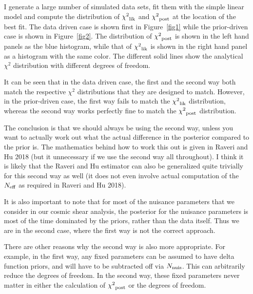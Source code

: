\documentclass[11pt]{article}
\newcommand{\nnuis}{{N_{\rm nuis}}}
\newcommand{\neff}{{N_{\rm eff}}}
\newcommand{\chisq}{{\chi^{2}}}
\begin{document}
I generate a large number of simulated data sets, fit them with the simple
linear model and compute the distribution of $\chisq_{\rm lik}$ and
$\chisq_{\rm post}$ at the location of the best fit. The data driven case is
shown first in Figure~\ref{fig1} while the prior-driven case is shown in
Figure~\ref{fig2}. The distribution of $\chisq_{\rm post}$ is shown in the left
hand panels as the blue histogram, while that of $\chisq_{\rm lik}$ is shown in
the right hand panel as a histogram with the same color. The different solid
lines show the analytical $\chisq$ distribution with different degrees of
freedom.

It can be seen that in the data driven case, the first and the second way both
match the respective $\chisq$ distributions that they are designed to match.
However, in the prior-driven case, the first way fails to match the
$\chisq_{\rm lik}$ distribution, whereas the second way works perfectly fine to
match the $\chisq_{\rm post}$ distribution.

The conclusion is that we should always be using the second way, unless you
want to actually work out what the actual difference in the posterior compared
to the prior is. The mathematics behind how to work this out is given in Raveri
and Hu 2018 (but it unnecessary if we use the second way all throughout). I
think it is likely that the Raveri and Hu estimator can also be generalized
quite trivially for this second way as well (it does not even involve actual
computation of the $\neff$ as required in Raveri and Hu 2018).

It is also important to note that for most of the nuisance parameters that we
consider in our cosmic shear analysis, the posterior for the nuisance
parameters is most of the time dominated by the priors, rather than the data
itself. Thus we are in the second case, where the first way is not the correct
approach.

There are other reasons why the second way is also more appropriate. For
example, in the first way, any fixed parameters can be assumed to have delta
function priors, and will have to be subtracted off via $\nnuis$. This can
arbitrarily reduce the degrees of freedom. In the second way, these fixed
parameters never matter in either the calculation of $\chisq_{\rm post}$ or the
degrees of freedom.
\end{document}

